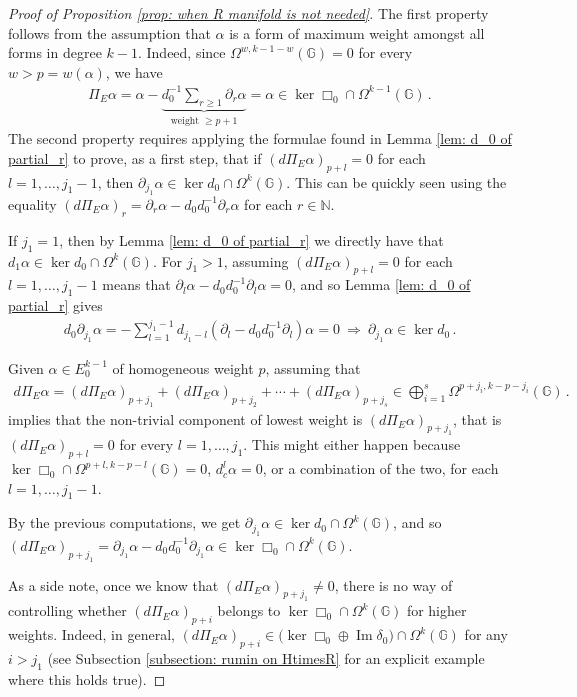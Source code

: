 \documentclass[dvipsnames]{amsart}
\theoremstyle{definition}
\theoremstyle{definition}
\numberwithin{equation}{section}
\newcommand{\N}{\mathbb{N}}
\newcommand{\G}{\mathbb{G}}
\begin{document}
\begin{proof}[Proof of Proposition \ref{prop: when R manifold is not needed}]
    The first property follows from the assumption that $\alpha$ is a form of maximum weight amongst all forms in degree $k-1$. Indeed, since $\Omega^{w,k-1-w}(\G)=0$ for every $w>p=w(\alpha)$, we have
    \begin{align*}
        \Pi_E\alpha=\alpha-\underbrace{d_0^{-1}\sum_{r\ge 1}\partial_r\alpha}_{\text{weight }\ge p+1}=\alpha\in\ker\Box_0\cap\Omega^{k-1}(\G)\,.
    \end{align*}
    The second property requires applying the formulae found in Lemma \ref{lem: d_0 of partial_r} to prove, as a first step, that if $\left(d\Pi_E\alpha\right)_{p+l}=0$ for each $l=1,\ldots,j_1-1$, then $\partial_{j_1}\alpha\in\ker d_0\cap\Omega^k(\G)$. This can be quickly seen using the equality $\left(d\Pi_E\alpha\right)_{r}=\partial_r\alpha-d_0d_0^{-1}\partial_r\alpha$ for each $r\in\N$.
    
    If $j_1=1$, then by Lemma \ref{lem: d_0 of partial_r} we directly have that $d_1\alpha\in\ker d_0\cap\Omega^k(\G)$. For $j_1>1$, assuming $\left(d\Pi_E\alpha\right)_{p+l}=0$ for each $l=1,\ldots,j_1-1$ means that $\partial_l\alpha-d_0d_0^{-1}\partial_l\alpha=0$, and so Lemma \ref{lem: d_0 of partial_r} gives
    \begin{align*}
        d_0\partial_{j_1}\alpha=-\sum_{l=1}^{j_1-1}d_{j_1-l}\left(\partial_l-d_0d_0^{-1}\partial_l\right)\alpha=0\ \Longrightarrow\ \partial_{j_1}\alpha\in\ker d_0\,.
    \end{align*}
      
    
    Given $\alpha\in E_0^{k-1}$ of homogeneous weight $p$, assuming that
    \begin{align*}
        d\Pi_E\alpha=\left(d\Pi_E\alpha\right)_{p+j_1}+\left(d\Pi_E\alpha\right)_{p+j_2}+\cdots+\left(d\Pi_E\alpha\right)_{p+j_s}\in\bigoplus_{i=1}^s\Omega^{p+j_i,k-p-j_i}(\G)\,.
    \end{align*}implies that the non-trivial component of lowest weight is $\left(d\Pi_E\alpha\right)_{p+j_1}$, that is $\left(d\Pi_E\alpha\right)_{p+l}=0$ for every $l=1,\ldots,j_1$. This might either happen because $\ker\Box_0\cap\Omega^{p+l,k-p-l}(\G)=0$, $d_c^l\alpha=0$, or a combination of the two, for each $l=1,\ldots,j_1-1$.

    By the previous computations, we get $\partial_{j_1}\alpha\in\ker d_0\cap\Omega^k(\G)$, and so $\left(d\Pi_E\alpha\right)_{p+j_1}=\partial_{j_1}\alpha-d_0d_0^{-1}\partial_{j_1}\alpha\in\ker\Box_0\cap\Omega^k(\G)$. 
    
    As a side note, once we know that $\left(d\Pi_E\alpha\right)_{p+j_1}\neq 0$, there is no way of controlling whether $(d\Pi_E\alpha)_{p+i}$ belongs to $\ker\Box_0\cap\Omega^k(\G)$ for higher weights. Indeed, in general, $(d\Pi_E\alpha)_{p+i}\in\big(\ker\Box_0\oplus\operatorname{Im}\delta_0\big)\cap\Omega^k(\G)$ for any $i>j_1$ (see Subsection \ref{subsection: rumin on HtimesR} for an explicit example where this holds true).
\end{proof}
\end{document}
